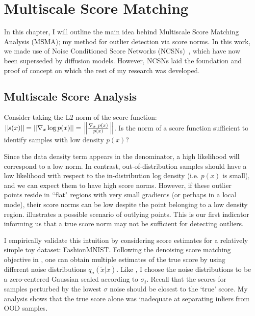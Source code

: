 \chapter{Multiscale Score Matching}
\label{ch:msma}

In this chapter, I will outline the main idea behind Multiscale Score Matching Analysis (MSMA); my method for outlier detection via score norms. In this work, we made use of Noise Conditioned Score Networks (NCSNs)~\cite{Song2019}, which have now been superseded by diffusion models. However, NCSNs laid the foundation and proof of concept on which the rest of my research was developed.

\section{Multiscale Score Analysis}
\label{multiscale}

Consider taking the L2-norm of the score function:
$ \left|\left| { s(x) } \right|\right| = \left|\left| { \nabla_{x} \log p(x)  } \right|\right| = \left|\left| { \frac{\nabla_{x}\text{~}p(x)}{p(x)} } \right|\right| $. Is the norm of a score function sufficient to identify samples with low density $p(x)$?

Since the data density term appears in the denominator, a high likelihood will correspond to a low norm. In contrast, out-of-distribution samples should have a low likelihood with respect to the in-distribution log density (i.e. $p(x)$ is small), and we can expect them to have high score norms. However, if these outlier points reside in ``flat" regions with very small gradients (or perhaps in a local mode),  their score norms can be low despite the point belonging to a low density region. 
 illustrates a possible scenario of outlying points.
This is our first indicator informing us that a true score norm may not be sufficient for detecting outliers. 

I empirically validate this intuition by considering score estimates for a relatively simple toy dataset: FashionMNIST. Following the denoising score matching objective in , one can obtain multiple estimates of the true score by using different noise distributions $q_{\sigma}(\tilde{x}|x)$. Like \cite{Song2019}, I choose the noise distributions to be a zero-centered Gaussian scaled according to $\sigma_i$. Recall that the scores for samples perturbed by the lowest $\sigma$ noise should be closest to the `true' score. My analysis shows that the true score alone was inadequate at separating inliers from OOD samples.

